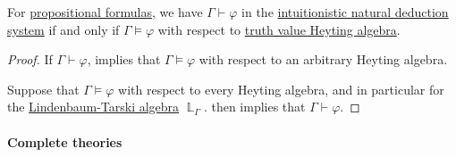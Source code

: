 \begin{corollary}\label{thm:intuitionistic_propositional_soundness_and_completeness}
  For \hyperref[def:propositional_syntax/formula]{propositional formulas}, we have \( \Gamma \vdash \varphi \) in the \hyperref[def:propositional_natural_deduction_systems]{intuitionistic natural deduction system} if and only if \( \Gamma \vDash \varphi \) with respect to  \hyperref[con:truth_value_algebra]{truth value Heyting algebra}.
\end{corollary}
\begin{proof}
  \SufficiencySubProof If \( \Gamma \vdash \varphi \),  implies that \( \Gamma \vDash \varphi \) with respect to an arbitrary Heyting algebra.

  \NecessitySubProof Suppose that \( \Gamma \vDash \varphi \) with respect to every Heyting algebra, and in particular for the \hyperref[def:lindenbaum_tarski_algebra]{Lindenbaum-Tarski algebra} \( \BbbL_\Gamma \).  then implies that \( \Gamma \vdash \varphi \).
\end{proof}

\paragraph{Complete theories}

